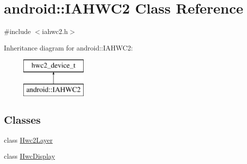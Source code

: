 \hypertarget{classandroid_1_1IAHWC2}{}\section{android\+:\+:I\+A\+H\+WC2 Class Reference}
\label{classandroid_1_1IAHWC2}


{\ttfamily \#include $<$iahwc2.\+h$>$}

Inheritance diagram for android\+:\+:I\+A\+H\+WC2\+:\begin{figure}[H]
\begin{center}
\leavevmode
\includegraphics[height=2.000000cm]{classandroid_1_1IAHWC2}
\end{center}
\end{figure}
\subsection*{Classes}
\begin{DoxyCompactItemize}
\item 
class \mbox{\hyperlink{classandroid_1_1IAHWC2_1_1Hwc2Layer}{Hwc2\+Layer}}
\item 
class \mbox{\hyperlink{classandroid_1_1IAHWC2_1_1HwcDisplay}{Hwc\+Display}}
\end{DoxyCompactItemize}
